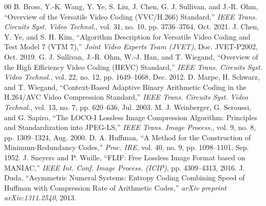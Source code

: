 \documentclass[conference]{IEEEtran}
\begin{document}
\begin{thebibliography}{00}
 B. Bross, Y.-K. Wang, Y. Ye, S. Liu, J. Chen, G. J. Sullivan, and J.-R. Ohm, ``Overview of the Versatile Video Coding (VVC/H.266) Standard,'' \textit{IEEE Trans. Circuits Syst. Video Technol.}, vol. 31, no. 10, pp. 3736--3764, Oct. 2021.
 J. Chen, Y. Ye, and S. H. Kim, ``Algorithm Description for Versatile Video Coding and Test Model 7 (VTM 7),'' \textit{Joint Video Experts Team (JVET)}, Doc. JVET-P2002, Oct. 2019.
 G. J. Sullivan, J.-R. Ohm, W.-J. Han, and T. Wiegand, ``Overview of the High Efficiency Video Coding (HEVC) Standard,'' \textit{IEEE Trans. Circuits Syst. Video Technol.}, vol. 22, no. 12, pp. 1649--1668, Dec. 2012.
 D. Marpe, H. Schwarz, and T. Wiegand, ``Context-Based Adaptive Binary Arithmetic Coding in the H.264/AVC Video Compression Standard,'' \textit{IEEE Trans. Circuits Syst. Video Technol.}, vol. 13, no. 7, pp. 620--636, Jul. 2003.
 M. J. Weinberger, G. Seroussi, and G. Sapiro, ``The LOCO-I Lossless Image Compression Algorithm: Principles and Standardization into JPEG-LS,'' \textit{IEEE Trans. Image Process.}, vol. 9, no. 8, pp. 1309--1324, Aug. 2000.
 D. A. Huffman, ``A Method for the Construction of Minimum-Redundancy Codes,'' \textit{Proc. IRE}, vol. 40, no. 9, pp. 1098--1101, Sep. 1952.
 J. Sneyers and P. Wuille, ``FLIF: Free Lossless Image Format based on MANIAC,'' \textit{IEEE Int. Conf. Image Process. (ICIP)}, pp. 4309--4313, 2016.
 J. Duda, ``Asymmetric Numeral Systems: Entropy Coding Combining Speed of Huffman with Compression Rate of Arithmetic Codes,'' \textit{arXiv preprint arXiv:1311.2540}, 2013.
\end{thebibliography}
\end{document}
